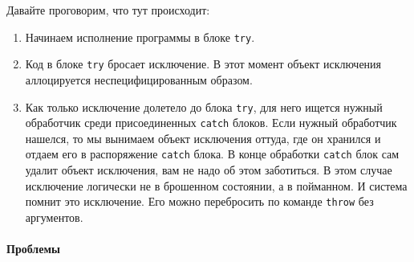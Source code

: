 Давайте проговорим, что тут происходит:
\begin{enumerate}
\item Начинаем исполнение программы в блоке \verb"try".

\item Код в блоке \verb"try" бросает исключение.
В этот момент объект исключения аллоцируется неспецифицированным образом.

\item Как только исключение долетело до блока \verb"try", для него ищется нужный обработчик среди присоединенных \verb"catch" блоков.
Если нужный обработчик нашелся, то мы вынимаем объект исключения оттуда, где он хранился и отдаем его в распоряжение \verb"catch" блока.
В конце обработки \verb"catch" блок сам удалит объект исключения, вам не надо об этом заботиться.
В этом случае исключение логически не в брошенном состоянии, а в пойманном.
И система помнит это исключение.
Его можно перебросить по команде \verb"throw" без аргументов.
\end{enumerate}

\paragraph{Проблемы}

